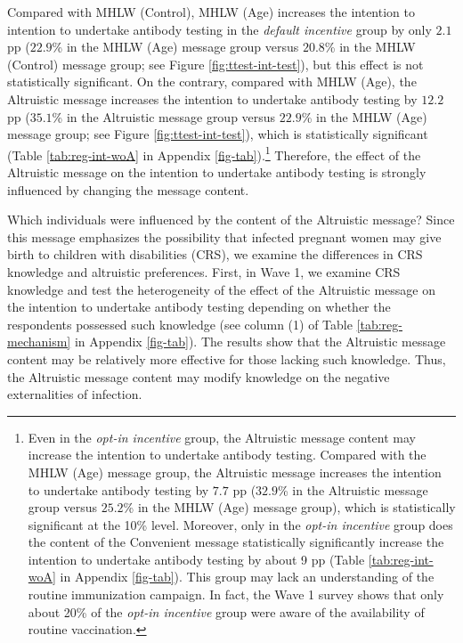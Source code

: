 \documentclass[
]{article}
\begin{document}
Compared with MHLW (Control), MHLW (Age) increases the intention to intention to undertake antibody testing in the \emph{default incentive} group by only \(2.1\) pp (\(22.9\)\% in the MHLW (Age) message group versus \(20.8\)\% in the MHLW (Control) message group; see Figure \ref{fig:ttest-int-test}), but this effect is not statistically significant. On the contrary, compared with MHLW (Age), the Altruistic message increases the intention to undertake antibody testing by \(12.2\) pp (\(35.1\)\% in the Altruistic message group versus \(22.9\)\% in the MHLW (Age) message group; see Figure \ref{fig:ttest-int-test}), which is statistically significant (Table \ref{tab:reg-int-woA} in Appendix \ref{fig-tab}).\footnote{Even in the \emph{opt-in incentive} group, the Altruistic message content may increase the intention to undertake antibody testing. Compared with the MHLW (Age) message group, the Altruistic message increases the intention to undertake antibody testing by \(7.7\) pp (\(32.9\)\% in the Altruistic message group versus \(25.2\)\% in the MHLW (Age) message group), which is statistically significant at the 10\% level. Moreover, only in the \emph{opt-in incentive} group does the content of the Convenient message statistically significantly increase the intention to undertake antibody testing by about 9 pp (Table \ref{tab:reg-int-woA} in Appendix \ref{fig-tab}). This group may lack an understanding of the routine immunization campaign. In fact, the Wave 1 survey shows that only about 20\% of the \emph{opt-in incentive} group were aware of the availability of routine vaccination.} Therefore, the effect of the Altruistic message on the intention to undertake antibody testing is strongly influenced by changing the message content.

Which individuals were influenced by the content of the Altruistic message? Since this message emphasizes the possibility that infected pregnant women may give birth to children with disabilities (CRS), we examine the differences in CRS knowledge and altruistic preferences. First, in Wave 1, we examine CRS knowledge and test the heterogeneity of the effect of the Altruistic message on the intention to undertake antibody testing depending on whether the respondents possessed such knowledge (see column (1) of Table \ref{tab:reg-mechanism} in Appendix \ref{fig-tab}). The results show that the Altruistic message content may be relatively more effective for those lacking such knowledge. Thus, the Altruistic message content may modify knowledge on the negative externalities of infection.
\end{document}
